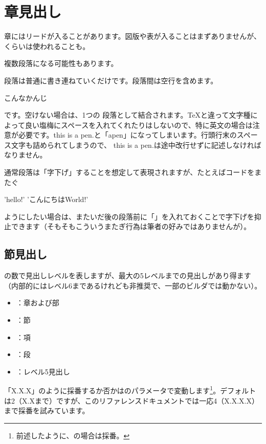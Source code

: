 \chapter{章見出し}
\label{chap:ch01}

章にはリードが入ることがあります。図版や表が入ることはまずありませんが、くらいは使われることも。

複数段落になる可能性もあります。

段落は普通に書き連ねていくだけです。段落間は空行を含めます。

こんなかんじ

です。空けない場合は、1つの 段落として結合されます。TeXと違って文字種によって良い塩梅にスペースを入れてくれたりはしないので、特に英文の場合は注意が必要です。this is a pen.と「apen」になってしまいます。行頭行末のスペース文字も詰められてしまうので、 this is a pen.は途中改行せずに記述しなければなりません。

通常段落は「字下げ」することを想定して表現されますが、たとえばコードをまたぐ

\begin{reviewlistblock}
\begin{reviewemlist}
'hello!' 'こんにちはWorld!'
\end{reviewemlist}
\end{reviewlistblock}

ようにしたい場合は、またいだ後の段落前に「」を入れておくことで字下げを抑止できます（そもそもこういうまたぎ行為は筆者の好みではありませんが）。

\section{節見出し}
\label{sec:1-1}

\reviewcode{=}の数で見出しレベルを表しますが、最大\reviewcode{=====}の5レベルまでの見出しがあり得ます（内部的にはレベル6まであるけれども非推奨で、一部のビルダでは動かない）。


\begin{itemize}
\item \reviewcode{=}：章および部
\item \reviewcode{==}：節
\item \reviewcode{===}：項
\item \reviewcode{====}：段
\item \reviewcode{=====}：レベル5見出し
\end{itemize}

「X.X.X」のように採番するか否かはのパラメータで変動します\footnote{前述したように、の場合は採番。}。デフォルトは2（X.Xまで）ですが、このリファレンスドキュメントでは一応4（X.X.X.X）まで採番を試みています。

